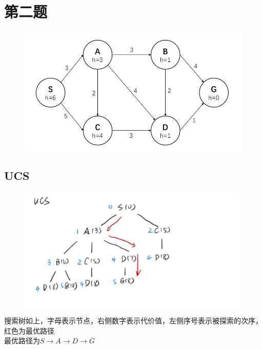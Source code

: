 \documentclass[12pt,a4paper]{article}
\begin{document}
\section{第二题}
\begin{figure}[H]
    \centering
    \includegraphics[scale = 0.8]{2.jpg}
    \label{figure}
\end{figure}
\subsection{UCS}
\begin{figure}[H]
    \centering
    \includegraphics[scale = 0.2]{ucs.jpg}
    \label{figure}
\end{figure}
搜索树如上，字母表示节点，右侧数字表示代价值，左侧序号表示被探索的次序，红色为最优路径\\
最优路径为$S\rightarrow A \rightarrow D\rightarrow G$
\end{document}
